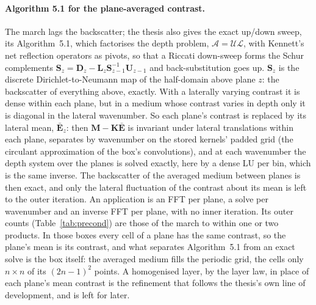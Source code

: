 \documentclass[11pt,a4paper]{article}
\newcommand{\bK}{\mathbf{K}}
\begin{document}
\paragraph{Algorithm 5.1 for the plane-averaged contrast.} The march lags the backscatter; the thesis also gives
the exact up/down sweep, its Algorithm~5.1, which factorises the depth problem, $\mathcal A=\mathcal U\mathcal L$,
with Kennett's net reflection operators as pivots, so that a Riccati down-sweep forms the Schur complements
$\mathbf S_z=\mathbf D_z-\mathbf L_z\mathbf S_{z-1}^{-1}\mathbf U_{z-1}$ and back-substitution goes up. $\mathbf S_z$
is the discrete Dirichlet-to-Neumann map of the half-domain above plane $z$: the backscatter of everything above,
exactly. With a laterally varying contrast it is dense within each plane, but in a medium whose contrast varies
in depth only it is diagonal in the lateral wavenumber. So each plane's contrast is replaced by its lateral mean,
$\bar{\mathbf E}_z$: then $\mathbf M-\bK\bar{\mathbf E}$ is invariant under lateral translations within each plane,
separates by wavenumber on the stored kernels' padded grid (the circulant approximation of the box's
convolutions), and at each wavenumber the depth system over the planes is solved exactly, here by a dense LU per
bin, which is the same inverse. The backscatter of the averaged medium between planes is then exact, and only the
lateral fluctuation of the contrast about its mean is left to the outer iteration. An application is an FFT per
plane, a solve per wavenumber and an inverse FFT per plane, with no inner iteration. Its outer counts
(Table~\ref{tab:precond}) are those of the march to within one or two products. In those boxes every cell of a
plane has the same contrast, so the plane's mean is its contrast, and what separates Algorithm~5.1 from an exact
solve is the box itself: the averaged medium fills the periodic grid, the cells only $n\times n$ of its
$(2n-1)^2$ points. A homogenised layer, by the layer law, in place of each plane's mean contrast is the refinement
that follows the thesis's own line of development, and is left for later.
\end{document}
